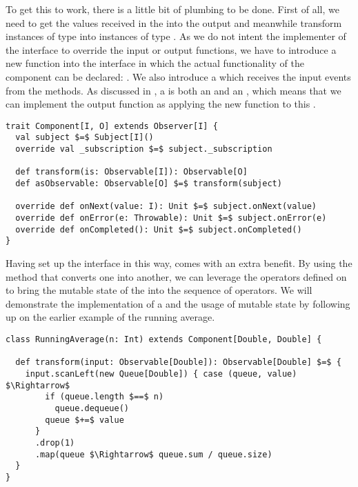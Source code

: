 To get this to work, there is a little bit of plumbing to be done. First of all, we need to get the values received in the \obv into the output \obs and meanwhile transform instances of type  into instances of type . As we do not intent the implementer of the \comp interface to override the input or output functions, we have to introduce a new function into the interface in which the actual functionality of the component can be declared: . We also introduce a \subj which receives the input events from the \obv methods. As discussed in , a \subj is both an \obv and an \obs, which means that we can implement the output function as applying the new  function to this \subj.

\begin{lstlisting}[style=ScalaStyle, caption={\comp interface}, label={lst:component-v1}]
trait Component[I, O] extends Observer[I] {
  val subject $=$ Subject[I]()
  override val _subscription $=$ subject._subscription
  
  def transform(is: Observable[I]): Observable[O]
  def asObservable: Observable[O] $=$ transform(subject)
  
  override def onNext(value: I): Unit $=$ subject.onNext(value)
  override def onError(e: Throwable): Unit $=$ subject.onError(e)
  override def onCompleted(): Unit $=$ subject.onCompleted()
}
\end{lstlisting}

Having set up the \comp interface in this way, comes with an extra benefit. By using the  method that converts one \obs into another, we can leverage the operators defined on \obs to bring the mutable state of the \comp into the sequence of operators. We will demonstrate the implementation of a \comp and the usage of mutable state by following up on the earlier example of the running average.

\begin{lstlisting}[style=ScalaStyle, caption={Implementation of \code{RunningAverage} using the \comp interface}, label={lst:running-average-final}]
class RunningAverage(n: Int) extends Component[Double, Double] {

  def transform(input: Observable[Double]): Observable[Double] $=$ {
    input.scanLeft(new Queue[Double]) { case (queue, value) $\Rightarrow$ 
        if (queue.length $==$ n)
          queue.dequeue()
        queue $+=$ value
      }
      .drop(1)
      .map(queue $\Rightarrow$ queue.sum / queue.size)
  }
}
\end{lstlisting}

